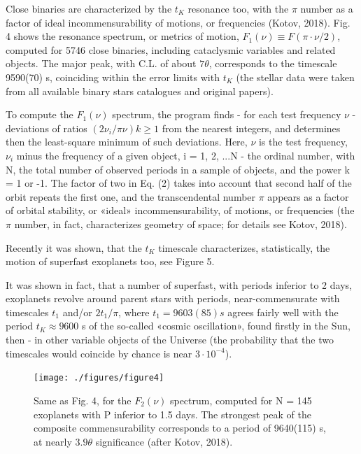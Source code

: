\documentclass[twoside,draft]{article}
\begin{document}
\begin{sloppypar}
Close binaries are characterized by the $t_{K}$ resonance too, with the $\pi$ number as a factor of ideal incommensurability of motions, or frequencies (Kotov, 2018). Fig. 4 shows the resonance spectrum, or metrics of motion, $F_{1} (\nu) \equiv F(\pi \cdot \nu/2)$, computed for 5746 close binaries, including cataclysmic variables and related objects. The major peak, with C.L. of about $7 \theta$, corresponds to the timescale 9590(70) s, coinciding within the error limits with $t_{K}$ (the stellar data were taken from all available binary stars catalogues and original papers).

To compute the $F_{1} (\nu)$ spectrum, the program finds - for each test frequency $\nu$ - deviations of ratios $(2\nu_{i} /\pi \nu) k \geq 1$ from the nearest integers, and determines then the least-square minimum of such deviations. Here, $\nu$ is the test frequency, $\nu_{i}$ minus the frequency of a given object, i = 1, 2, ...N - the ordinal number, with N, the total number of observed periods in a sample of objects, and the power k = 1 or -1. The factor of two in Eq. (2) takes into account that second half of the orbit repeats the first one, and the transcendental number $\pi$ appears as a factor of orbital stability, or «ideal» incommensurability, of motions, or frequencies (the $\pi$ number, in fact, characterizes geometry of space; for details see Kotov, 2018).

Recently it was shown, that the $t_K$ timescale characterizes, statistically, the motion of superfast exoplanets too, see Figure 5.

It was shown in fact, that a number of superfast, with periods inferior to 2 days, exoplanets revolve around parent stars with periods, near-commensurate with timescales $t_{1}$ and/or $2 t_{1}/\pi$, where $t_{1} = 9603(85) s$ agrees fairly well with the period $t_{K} \approx 9600$ s of the so-called «cosmic oscillation», found firstly in the Sun, then - in other variable objects of the Universe (the probability that the two timescales would coincide by chance is near $3 \cdot 10^{-4}$).

\begin{figure}
\centering
\texttt{[image: ./figures/figure4]}
\caption{Same as Fig. 4, for the $F_{2} ( \nu )$ spectrum, computed for N = 145 exoplanets with P inferior to 1.5 days. The strongest peak of the composite commensurability corresponds to a period of 9640(115) s, at nearly $3.9\theta$ significance (after Kotov, 2018).}
\label{fig:figure_label}
\end{figure}


\end{sloppypar}
\end{document}
